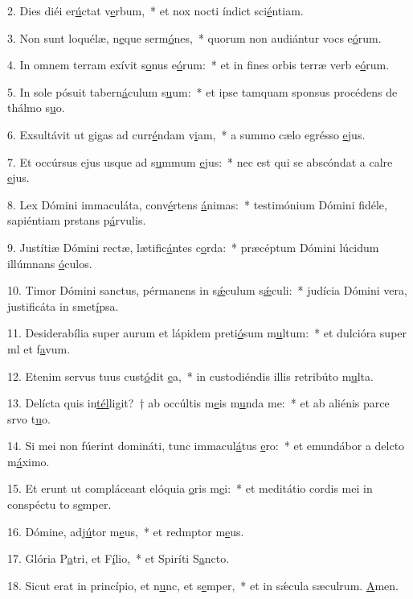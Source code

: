 2. Dies diéi er\uline{ú}ctat v\uline{e}rbum,~* et nox nocti índict sci\uline{é}ntiam.\par 
3. Non sunt loquélæ, n\uline{e}que serm\uline{ó}nes,~* quorum non audiántur vocs e\uline{ó}rum.\par 
4. In omnem terram exívit s\uline{o}nus e\uline{ó}rum:~* et in fines orbis terræ verb e\uline{ó}rum.\par 
5. In sole pósuit tabern\uline{á}culum s\uline{u}um:~* et ipse tamquam sponsus procédens de thálmo s\uline{u}o.\par 
6. Exsultávit ut gigas ad curr\uline{é}ndam v\uline{i}am,~* a summo cælo egrésso \uline{e}jus.\par 
7. Et occúrsus ejus usque ad s\uline{u}mmum \uline{e}jus:~* nec est qui se abscóndat a calre \uline{e}jus.\par 
8. Lex Dómini immaculáta, conv\uline{é}rtens \uline{á}nimas:~* testimónium Dómini fidéle, sapiéntiam prstans p\uline{á}rvulis.\par 
9. Justítiæ Dómini rectæ, lætific\uline{á}ntes c\uline{o}rda:~* præcéptum Dómini lúcidum illúmnans \uline{ó}culos.\par 
10. Timor Dómini sanctus, pérmanens in s\uline{ǽ}culum s\uline{ǽ}culi:~* judícia Dómini vera, justificáta in smet\uline{í}psa.\par 
11. Desiderabília super aurum et lápidem preti\uline{ó}sum m\uline{u}ltum:~* et dulcióra super ml et f\uline{a}vum.\par 
12. Etenim servus tuus cust\uline{ó}dit \uline{e}a,~* in custodiéndis illis retribúto m\uline{u}lta.\par 
13. Delícta quis in\uline{tél}ligit?~† ab occúltis m\uline{e}is m\uline{u}nda me:~* et ab aliénis parce srvo t\uline{u}o.\par 
14. Si mei non fúerint domináti, tunc immacul\uline{á}tus \uline{e}ro:~* et emundábor a delcto m\uline{á}ximo.\par 
15. Et erunt ut compláceant elóquia \uline{o}ris m\uline{e}i:~* et meditátio cordis mei in conspéctu to s\uline{e}mper.\par 
16. Dómine, adj\uline{ú}tor m\uline{e}us,~* et redmptor m\uline{e}us.\par 
17. Glória P\uline{a}tri, et F\uline{í}lio,~* et Spiríti S\uline{a}ncto.\par 
18. Sicut erat in princípio, et n\uline{u}nc, et s\uline{e}mper,~* et in sǽcula sæculrum. \uline{A}men.\par 
